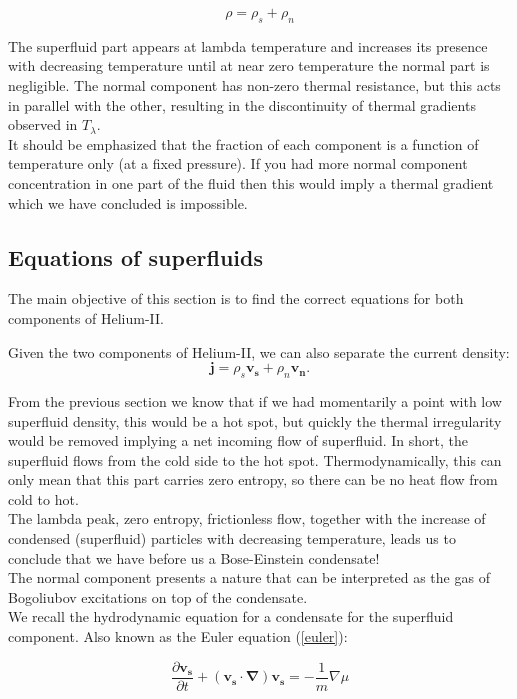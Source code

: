 \documentclass{article}
\begin{document}
\[\rho = \rho_s + \rho_n\]

The superfluid part appears at lambda temperature and increases its presence with decreasing temperature until at near zero temperature the normal part is negligible. The normal component has non-zero thermal resistance, but this acts in parallel with the other, resulting in the discontinuity of thermal gradients observed in $T_\lambda$.
\\

It should be emphasized that the fraction of each component is a function of temperature only (at a fixed pressure). If you had more normal component concentration in one part of the fluid then this would imply a thermal gradient which we have concluded is impossible.
\\

\subsection{Equations of superfluids}

The main objective of this section is to find the correct equations for both components of Helium-II\@.

Given the two components of Helium-II, we can also separate the current density:
\[\mathbf{j} = \rho_s \mathbf{v_s}+\rho_n \mathbf{v_n}\text{.}\]

From the previous section we know that if we had momentarily a point with low superfluid density, this would be a hot spot, but quickly the thermal irregularity would be removed implying a net incoming flow of superfluid. In short, the superfluid flows from the cold side to the hot spot. Thermodynamically, this can only mean that this part carries zero entropy, so there can be no heat flow from cold to hot.
\\

The lambda peak, zero entropy, frictionless flow, together with the increase of condensed (superfluid) particles with decreasing temperature, leads us to conclude that we have before us a Bose-Einstein condensate!
\\

The normal component presents a nature that can be interpreted as the gas of Bogoliubov excitations on top of the condensate.
\\

We recall the hydrodynamic equation for a condensate for the superfluid component. Also known as the Euler equation (\ref{euler}): 

\[\frac{\partial \mathbf{v_s}}{\partial t} + (\mathbf{v_s}\cdot \mathbf{\nabla})\mathbf{v_s} = -\frac{1}{m}\nabla \mu\]
\end{document}
